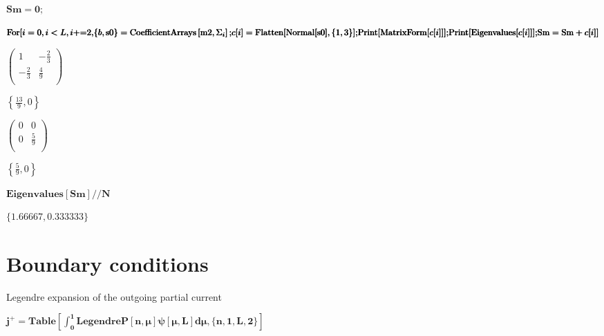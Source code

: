 \documentclass{article}
\begin{document}
\begin{doublespace}
\noindent\(\pmb{\text{Sm}=0;}\)
\end{doublespace}

\begin{doublespace}
\noindent\(\pmb{\text{For}[i=0,i<L,i\text{+=}2,}\\
\pmb{\{b,\text{s0}\}=\text{CoefficientArrays}\left[\text{m2}, \Sigma _i\right];}\\
\pmb{c[i]=\text{Flatten}[ \text{Normal}[\text{s0}],\{1,3\}];}\\
\pmb{\text{Print}[\text{MatrixForm}[c[i]]];}\\
\pmb{\text{Print}[\text{Eigenvalues}[c[i]]];}\\
\pmb{\text{Sm}=\text{Sm}+c[i]}\\
\pmb{]}\)
\end{doublespace}

\noindent\(\left(
\begin{array}{cc}
 1 & -\frac{2}{3} \\
 -\frac{2}{3} & \frac{4}{9} \\
\end{array}
\right)\)

\noindent\(\left\{\frac{13}{9},0\right\}\)

\noindent\(\left(
\begin{array}{cc}
 0 & 0 \\
 0 & \frac{5}{9} \\
\end{array}
\right)\)

\noindent\(\left\{\frac{5}{9},0\right\}\)

\begin{doublespace}
\noindent\(\pmb{\text{Eigenvalues}[\text{Sm}]\text{//}N}\)
\end{doublespace}

\begin{doublespace}
\noindent\(\{1.66667,0.333333\}\)
\end{doublespace}

\section*{Boundary conditions}

Legendre expansion of the outgoing partial current 

\begin{doublespace}
\noindent\(\pmb{j^+=\text{Table}\left[\int _0^1\text{LegendreP}[n,\mu ]\psi [\mu ,L]d\mu ,\{n,1,L,2\}\right]}\)
\end{doublespace}
\end{document}
